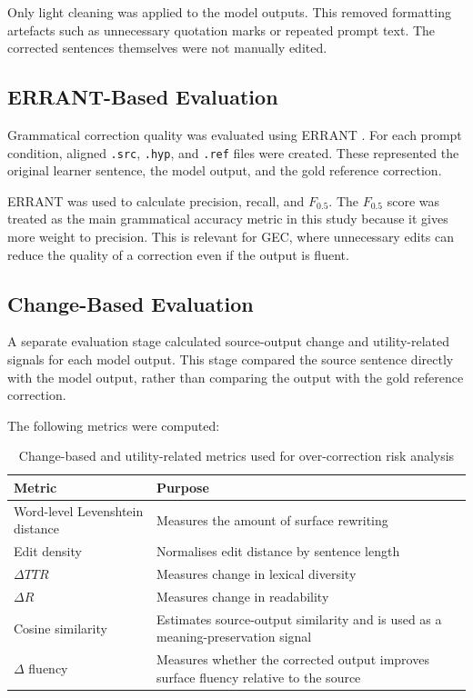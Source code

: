 Only light cleaning was applied to the model outputs. This removed formatting artefacts such as unnecessary quotation marks or repeated prompt text. The corrected sentences themselves were not manually edited.

\subsection{ERRANT-Based Evaluation}

Grammatical correction quality was evaluated using ERRANT \cite{bryant-etal-2017-automatic}. For each prompt condition, aligned \texttt{.src}, \texttt{.hyp}, and \texttt{.ref} files were created. These represented the original learner sentence, the model output, and the gold reference correction.

ERRANT was used to calculate precision, recall, and $F_{0.5}$. The $F_{0.5}$ score was treated as the main grammatical accuracy metric in this study because it gives more weight to precision. This is relevant for GEC, where unnecessary edits can reduce the quality of a correction even if the output is fluent.

\subsection{Change-Based Evaluation}

A separate evaluation stage calculated source-output change and utility-related signals for each model output. This stage compared the source sentence directly with the model output, rather than comparing the output with the gold reference correction.

The following metrics were computed:

\begin{table}[htbp]
    \centering
    \caption{Change-based and utility-related metrics used for over-correction risk analysis}
    \label{tab:style_metrics}
    \begin{tabular}{|p{5cm}|p{8cm}|}
        \hline
        \textbf{Metric} & \textbf{Purpose} \\
        \hline
        Word-level Levenshtein distance & Measures the amount of surface rewriting \\
        \hline
        Edit density & Normalises edit distance by sentence length \\
        \hline
        $\Delta TTR$ & Measures change in lexical diversity \\
        \hline
        $\Delta R$ & Measures change in readability \\
        \hline
        Cosine similarity & Estimates source-output similarity and is used as a meaning-preservation signal \\
        \hline
        $\Delta$ fluency & Measures whether the corrected output improves surface fluency relative to the source \\
        \hline
    \end{tabular}
\end{table}

